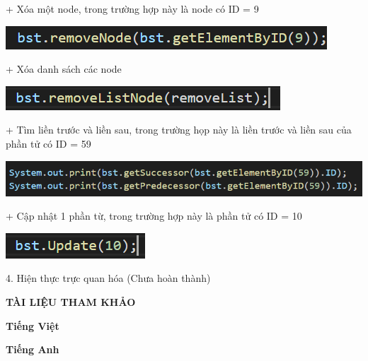 \documentclass{report}
\begin{document}
+ Xóa một node, trong trường hợp này là node có ID = 9
\begin{center}
     \includegraphics[scale=1.2]{a4}
    \end{center}

+ Xóa danh sách các node
\begin{center}
     \includegraphics[scale=1.2]{a5}
    \end{center}

+ Tìm liền trước và liền sau, trong trường họp này là liền trước và liền sau của phần tử có ID = 59
\begin{center}
     \includegraphics[scale=1.2]{a6}
    \end{center}
    
+ Cập nhật 1 phần từ, trong trường hợp này là phần tử có ID = 10
\begin{center}
     \includegraphics[scale=1.2]{a7}
    \end{center}
    
4. Hiện thực trực quan hóa (Chưa hoàn thành)
    



    

    
    


\newpage
\changefontsizes{16pt}
\centerline{\textbf{TÀI LIỆU THAM KHẢO}}

\vspace{1.2cm}
\changefontsizes{14pt}
\textbf{Tiếng Việt}


\vspace{3cm}
\textbf{Tiếng Anh}
\end{document}
